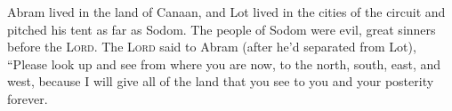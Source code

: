\begin{inparaenum}
     Abram lived in the land of Canaan, and Lot lived in the cities of the circuit and pitched his tent as far as Sodom.%
     The people of Sodom were evil, great sinners before the \textsc{Lord}.%
     The \textsc{Lord} said to Abram (after he'd separated from Lot), ``Please look up and see from where you are now, to the north, south, east, and west,%
     because I will give all of the land that you see to you and your posterity forever.%
\end{inparaenum}
